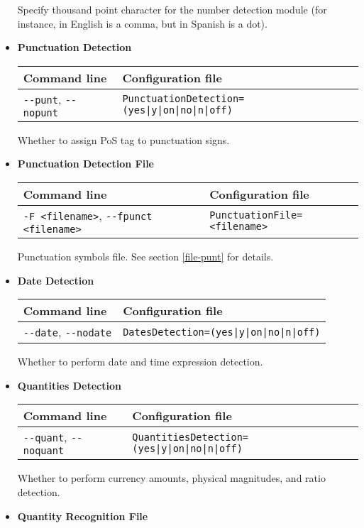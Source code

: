 \documentclass[a4paper]{book}
\begin{document}
\begin{itemize}
   Specify thousand point character for the number detection module
   (for instance, in English is a comma, but in Spanish is a dot).

\item {\bf Punctuation Detection}

\begin{tabular}{|l|l|}
Command line       & Configuration file   \\ \hline
\verb#--punt#, \verb#--nopunt#    & \verb#PunctuationDetection=(yes|y|on|no|n|off)# \\ \hline
\end{tabular}

 Whether to assign PoS tag to punctuation signs.

\item {\bf Punctuation Detection File}

\begin{tabular}{|l|l|}
Command line       & Configuration file   \\ \hline
\verb#-F <filename>#, \verb#--fpunct <filename># & \verb#PunctuationFile=<filename># \\ \hline
\end{tabular}

  Punctuation symbols file.  See section \ref{file-punt} for details.

\item {\bf Date Detection}

\begin{tabular}{|l|l|}
Command line       & Configuration file   \\ \hline
\verb#--date#, \verb#--nodate#    & \verb#DatesDetection=(yes|y|on|no|n|off)# \\ \hline
\end{tabular}

  Whether to perform date and time expression detection.

\item {\bf Quantities Detection}

\begin{tabular}{|l|l|}
Command line       & Configuration file   \\ \hline
\verb#--quant#, \verb#--noquant#   & \verb#QuantitiesDetection=(yes|y|on|no|n|off)# \\ \hline
\end{tabular}

 Whether to perform currency amounts, physical magnitudes, and ratio
 detection.

\item {\bf Quantity Recognition File}


\end{itemize}
\end{document}
